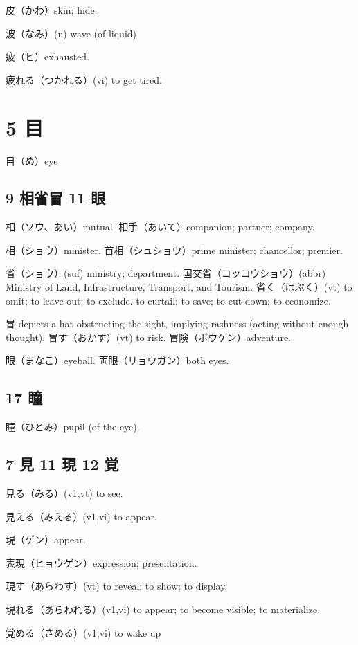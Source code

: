 皮（かわ）skin; hide.

波（なみ）(n) wave (of liquid)

疲（ヒ）exhausted.

疲れる（つかれる）(vi) to get tired.

\section{5 目}

目（め）eye

\subsection{9 相省冒 11 眼}

相（ソウ、あい）mutual.
相手（あいて）companion; partner; company.

相（ショウ）minister.
首相（シュショウ）prime minister; chancellor; premier.

省（ショウ）(suf) ministry; department.
国交省（コッコウショウ）(abbr)
Ministry of Land, Infrastructure, Transport, and Tourism.
省く（はぶく）(vt)
to omit; to leave out; to exclude.
to curtail; to save; to cut down; to economize.

冒 depicts a hat obstructing the sight, implying rashness
(acting without enough thought).
冒す（おかす）(vt) to risk.
冒険（ボウケン）adventure.

眼（まなこ）eyeball.
両眼（リョウガン）both eyes.

\subsection{17 瞳}

瞳（ひとみ）pupil (of the eye).

\subsection{7 見 11 現 12 覚}

見る（みる）(v1,vt) to see.

見える（みえる）(v1,vi) to appear.

現（ゲン）appear.

表現（ヒョウゲン）expression; presentation.

現す（あらわす）(vt) to reveal; to show; to display.

現れる（あらわれる）(v1,vi) to appear; to become visible; to materialize.

覚める（さめる）(v1,vi) to wake up

